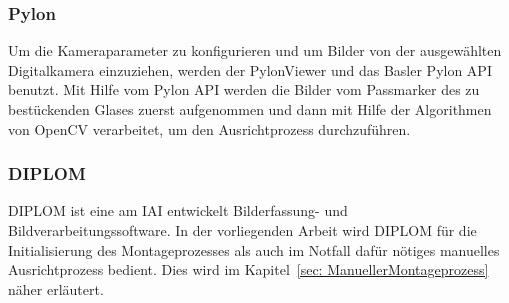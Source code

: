\subsubsection{Pylon}

Um die Kameraparameter zu konfigurieren und um Bilder von der ausgewählten Digitalkamera einzuziehen, werden der PylonViewer und das Basler Pylon API benutzt. Mit Hilfe vom Pylon API werden die Bilder vom Passmarker des zu bestückenden Glases zuerst aufgenommen und dann mit Hilfe der Algorithmen von OpenCV verarbeitet, um den Ausrichtprozess durchzuführen.

\subsubsection{DIPLOM}

DIPLOM ist eine am IAI entwickelt Bilderfassung- und Bildverarbeitungssoftware. In d{}er vorliegenden Arbeit wird DIPLOM für die Initialisierung des Montageprozesses als auch im Notfall dafür nötiges manuelles Ausrichtprozess bedient. Dies wird im Kapitel~\ref{sec: ManuellerMontageprozess} näher erläutert.